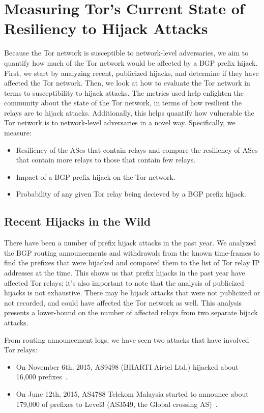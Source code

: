 \section{Measuring Tor's Current State of Resiliency to Hijack Attacks}

Because the Tor network is susceptible to network-level adversaries, we aim to quantify how much of the Tor network would be affected by a BGP prefix hijack.  First, we start by analyzing recent, publicized hijacks, and determine if they have affected the Tor network.  Then, we look at how to evaluate the Tor network in terms to susceptibility to hijack attacks.  The metrics used help enlighten the community about the state of the Tor network, in terms of how resilient the relays are to hijack attacks.  Additionally, this helps quantify how vulnerable the Tor network is to network-level adversaries in a novel way.  Specifically, we measure:

\begin{itemize}
\item Resiliency of the ASes that contain relays and compare the resiliency of ASes that contain more relays to those that contain few relays.
\item Impact of a BGP prefix hijack on the Tor network.
\item Probability of any given Tor relay being decieved by a BGP prefix hijack.
\end{itemize}

\subsection{Recent Hijacks in the Wild}

There have been a number of prefix hijack attacks in the past year.  We analyzed the BGP routing announcements and withdrawals from the known time-frames to find the prefixes that were hijacked and compared them to the list of Tor relay IP addresses at the time.  This shows us that prefix hijacks in the past year have affected Tor relays; it's also important to note that the analysis of publicized hijacks is not exhaustive.  There may be hijack attacks that were not publicized or not recorded, and could have affected the Tor network as well.  This analysis presents a lower-bound on the number of affected relays from two separate hijack attacks.  

From routing announcement logs, we have seen two attacks that have involved Tor relays: 

\begin{itemize}
\item On November 6th, 2015, AS9498 (BHARTI Airtel Ltd.) hijacked about 16,000 prefixes~\cite{indiahijack}.
\item On June 12th, 2015, AS4788 Telekom Malaysia started to announce about 179,000 of prefixes to Level3 (AS3549, the Global crossing AS)~\cite{malaysialeak}.
\end{itemize}

